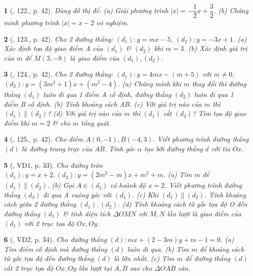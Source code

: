 \documentclass{article}
\newtheorem{baitoan}{}
\begin{document}
\begin{baitoan}[\cite{Tuyen_Toan_9_old}, 122., p. 42]
	Dùng đồ thị để: (a) Giải phương trình $|x| = -\dfrac{1}{2}x + \dfrac{3}{2}$. (b) Chứng minh phương trình $|x| = x - 2$ vô nghiệm.
\end{baitoan}

\begin{baitoan}[\cite{Tuyen_Toan_9_old}, 123., p. 42]
	Cho 2 đường thẳng: $(d_1): y = mx - 5$, $(d_2):y = -3x + 1$. (a) Xác định tọa độ giao điểm A của $(d_1)$ \& $(d_2)$ khi $m = 3$. (b) Xác định giá trị của $m$ để $M(3,-8)$ là giao điểm của $(d_1),(d_2)$.
\end{baitoan}

\begin{baitoan}[\cite{Tuyen_Toan_9_old}, 124., p. 42]
	Cho 2 đường thẳng: $(d_1):y = 4mx - (m + 5)$ với $m\ne0$, $(d_2):y = (3m^2 + 1)x + (m^2 - 4)$. (a) Chứng minh khi $m$ thay đổi thì đường thẳng $(d_1)$ luôn đi qua 1 điểm A cố định, đường thẳng $(d_2)$ luôn đi qua 1 điểm B cố định. (b) Tính khoảng cách AB. (c) Với giá trị nào của $m$ thì $(d_1)\parallel(d_2)$? (d) Với giá trị nào của $m$ thì $(d_1)$ cắt $(d_2)$? Tìm tọa độ giao điểm khi $m = 2$ \& cho $m$ tổng quát.
\end{baitoan}

\begin{baitoan}[\cite{Tuyen_Toan_9_old}, 125., p. 42]
	Cho điểm $A(0,-1),B(-4,3)$. Viết phương trình đường thẳng $(d)$ là đường trung trực của AB. Tính góc $\alpha$ tạo bởi đường thẳng $d$ với tia $Ox$.
\end{baitoan}

\begin{baitoan}[\cite{Kien_dai_so_9}, VD1, p. 33]
	Cho đường tròn $(d_1):y = x + 2,(d_2):y = (2m^2 - m)x + m^2 + m$. (a) Tìm $m$ để $(d_1)\parallel(d_2)$. (b) Gọi $A\in(d_2)$ có hoành độ $x = 2$. Viết phương trình đường thẳng $(d_3)$ đi qua A vuông góc với $(d_1)$. (c) Khi $(d_1)\parallel(d_2)$. Tính khoảng cách giữa 2 đường thẳng $(d_1),(d_2)$. (d) Tính khoảng cách từ gốc tọa độ O đến đường thẳng $(d_1)$ \& tính diện tích $\Delta OMN$ với $M,N$ lần lượt là giao điểm của $(d_1)$ với 2 trục tọa độ $Ox,Oy$.
\end{baitoan}

\begin{baitoan}[\cite{Kien_dai_so_9}, VD2, p. 34]
	Cho đường thẳng $(d):mx + (2 - 3m)y + m - 1 = 0$. (a) Tìm điểm cố định mà đường thẳng $(d)$ luôn đi qua. (b) Tìm $m$ để khoảng cách từ gốc tọa độ đến đường thẳng $(d)$ là lớn nhất. (c) Tìm $m$ để đường thẳng $(d)$ cắt 2 trục tọa độ $Ox,Oy$ lần lượt tại $A,B$ sao cho $\Delta OAB$ cân.
\end{baitoan}
\end{document}
